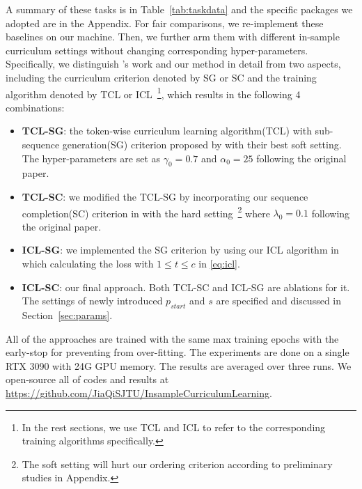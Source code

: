 A summary of these tasks is in Table~\ref{tab:taskdata} and the specific packages we adopted are in the Appendix. 
For fair comparisons, we re-implement these baselines on our machine. Then, we further arm them with different in-sample curriculum settings without changing corresponding hyper-parameters. Specifically, we distinguish \citet{liang-etal-2021-token-wise}'s work and our method in detail from two aspects, including the curriculum criterion denoted by SG or SC and the training algorithm denoted by TCL or ICL~\footnote{In the rest sections, we use TCL and ICL to refer to the corresponding training algorithms specifically.}, which results in the following 4 combinations:
\begin{itemize}
	\item \textbf{TCL-SG}: the token-wise curriculum learning algorithm(TCL) with sub-sequence generation(SG) criterion proposed by \citet{liang-etal-2021-token-wise} with their best soft setting. The hyper-parameters are set as $\gamma_0=0.7$ and $\alpha_0=25$ following the original paper.
	\item \textbf{TCL-SC}: we modified the TCL-SG by incorporating our sequence completion(SC) criterion in  with the hard setting~\footnote{The soft setting will hurt our ordering criterion according to preliminary studies in Appendix.} where $\lambda_0=0.1$ following the original paper.
	\item \textbf{ICL-SG}: we implemented the SG criterion by using our ICL algorithm in  which calculating the loss with $1\leq t \leq c$ in \eqref{eq:icl}.
	\item \textbf{ICL-SC}: our final approach. Both TCL-SC and ICL-SG are ablations for it. The settings of newly introduced $p_{start}$ and $s$ are specified and discussed in Section~\ref{sec:params}.
\end{itemize}

All of the approaches are trained with the same max training epochs with the early-stop for preventing from over-fitting.
The experiments are done on a single RTX 3090 with 24G GPU memory. The results are averaged over three runs. We open-source all of codes and results at \url{https://github.com/JiaQiSJTU/InsampleCurriculumLearning}. %


